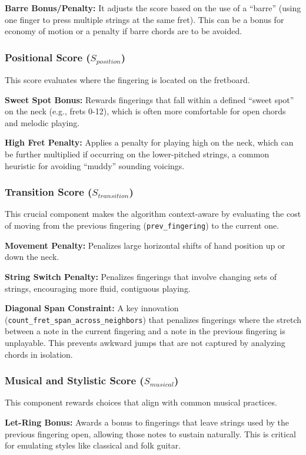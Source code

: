 \documentclass[conference]{IEEEtran}
\begin{document}
\textbf{Barre Bonus/Penalty:} It adjusts the score based on the use of a ``barre'' (using one finger to press multiple strings at the same fret). This can be a bonus for economy of motion or a penalty if barre chords are to be avoided.

\subsubsection{Positional Score ($S_{position}$)}
This score evaluates where the fingering is located on the fretboard.

\textbf{Sweet Spot Bonus:} Rewards fingerings that fall within a defined ``sweet spot'' on the neck (e.g., frets 0-12), which is often more comfortable for open chords and melodic playing.

\textbf{High Fret Penalty:} Applies a penalty for playing high on the neck, which can be further multiplied if occurring on the lower-pitched strings, a common heuristic for avoiding ``muddy'' sounding voicings.

\subsubsection{Transition Score ($S_{transition}$)}
This crucial component makes the algorithm context-aware by evaluating the cost of moving from the previous fingering (\texttt{prev\_fingering}) to the current one.

\textbf{Movement Penalty:} Penalizes large horizontal shifts of hand position up or down the neck.

\textbf{String Switch Penalty:} Penalizes fingerings that involve changing sets of strings, encouraging more fluid, contiguous playing.

\textbf{Diagonal Span Constraint:} A key innovation (\texttt{count\_fret\_span\_across\_neighbors}) that penalizes fingerings where the stretch between a note in the current fingering and a note in the previous fingering is unplayable. This prevents awkward jumps that are not captured by analyzing chords in isolation.

\subsubsection{Musical and Stylistic Score ($S_{musical}$)}
This component rewards choices that align with common musical practices.

\textbf{Let-Ring Bonus:} Awards a bonus to fingerings that leave strings used by the previous fingering open, allowing those notes to sustain naturally. This is critical for emulating styles like classical and folk guitar.
\end{document}
